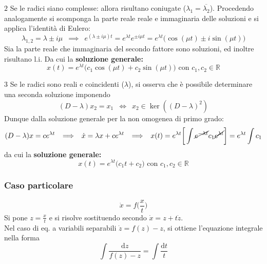 \documentclass[10pt, oneside]{book}
\theoremstyle{plain}
\begin{document}
$\boxed{2}$ Se le radici siano complesse: allora risultano coniugate ($\lambda_1 = \overline{\lambda_2}$). Procedendo analogamente si scomponga la parte reale reale e immaginaria delle soluzioni e si applica l'identità di Eulero:
\[\lambda_{1,2} = \lambda \pm i \mu \enspace \implies \enspace e^{(\lambda \pm i \mu) t} = e^{\lambda t}e^{\pm i\mu t} = e^{\lambda t}\big(\cos(\mu t) \pm i \sin(\mu t)\big)\]
Sia la parte reale che immaginaria del secondo fattore sono soluzioni, ed inoltre risultano l.i. Da cui la \textbf{soluzione generale:}
\[\boxed{x(t) = e^{\lambda t}\big(c_1 \cos(\mu t) + c_2 \sin(\mu t)\big)} \textrm{ con } c_1, c_2 \in \mathbb{R}\]

$\boxed{3}$ Se le radici sono reali e coincidenti ($\lambda$), si osserva che è possibile determinare una seconda soluzione imponendo 
\[(D - \lambda) x_2 = x_1 \enspace \Leftrightarrow \enspace x_2 \in \ker((D - \lambda)^2)\]
Dunque dalla soluzione generale per la non omogenea di primo grado:
\[(D - \lambda) x = c e^{\lambda t} \enspace \implies \enspace \dot x = \lambda x + c e^{\lambda t} \enspace \implies \enspace x(t) = e^{\lambda t}\bigg[\int \cancel{e^{-\lambda t}} c_1 \cancel{e^{\lambda t}}\bigg] = e^{\lambda t} \int c_1\]
da cui la \textbf{soluzione generale:}
\[\boxed{x(t) = e^{\lambda t}\big(c_1 t + c_2\big)} \textrm{ con } c_1, c_2 \in \mathbb{R}\]

\subsubsection*{Caso particolare}
\[\dot x = f\big(\frac{x}{t}\big)\]
Si pone $\displaystyle z = \frac{x}{t}$ e si risolve sostituendo secondo $\dot x = z + t \dot z$.
\\Nel caso di eq. a variabili separabili $\dot z = f(z) - z$, si ottiene l'equazione integrale nella forma
\[\int \frac{\textrm{d}z}{f(z) - z} = \int\frac{\textrm{d}t}{t}\]
\end{document}

